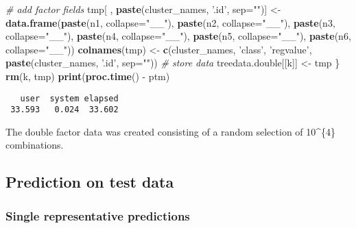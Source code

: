 \documentclass[]{article}
\newenvironment{Shaded}{\begin{snugshade}}{\end{snugshade}}
\newcommand{\KeywordTok}[1]{\textcolor[rgb]{0.13,0.29,0.53}{\textbf{{#1}}}}
\newcommand{\DataTypeTok}[1]{\textcolor[rgb]{0.13,0.29,0.53}{{#1}}}
\newcommand{\StringTok}[1]{\textcolor[rgb]{0.31,0.60,0.02}{{#1}}}
\newcommand{\CommentTok}[1]{\textcolor[rgb]{0.56,0.35,0.01}{\textit{{#1}}}}
\newcommand{\NormalTok}[1]{{#1}}
\begin{document}
\begin{Shaded}
\begin{Highlighting}[]
  \CommentTok{# add factor fields }
  \NormalTok{tmp[ , }\KeywordTok{paste}\NormalTok{(cluster_names, }\StringTok{'.id'}\NormalTok{, }\DataTypeTok{sep=}\StringTok{""}\NormalTok{)] <-}\StringTok{ }\KeywordTok{data.frame}\NormalTok{(}\KeywordTok{paste}\NormalTok{(n1, }\DataTypeTok{collapse=}\StringTok{"__"}\NormalTok{), }
                                              \KeywordTok{paste}\NormalTok{(n2, }\DataTypeTok{collapse=}\StringTok{"__"}\NormalTok{),}
                                              \KeywordTok{paste}\NormalTok{(n3, }\DataTypeTok{collapse=}\StringTok{"__"}\NormalTok{),}
                                              \KeywordTok{paste}\NormalTok{(n4, }\DataTypeTok{collapse=}\StringTok{"__"}\NormalTok{),}
                                              \KeywordTok{paste}\NormalTok{(n5, }\DataTypeTok{collapse=}\StringTok{"__"}\NormalTok{),}
                                              \KeywordTok{paste}\NormalTok{(n6, }\DataTypeTok{collapse=}\StringTok{"__"}\NormalTok{))}
  \KeywordTok{colnames}\NormalTok{(tmp) <-}\StringTok{ }\KeywordTok{c}\NormalTok{(cluster_names, }\StringTok{'class'}\NormalTok{, }\StringTok{'regvalue'}\NormalTok{, }
                     \KeywordTok{paste}\NormalTok{(cluster_names, }\StringTok{'.id'}\NormalTok{, }\DataTypeTok{sep=}\StringTok{""}\NormalTok{))}
  \CommentTok{# store data}
  \NormalTok{treedata.double[[k]] <-}\StringTok{ }\NormalTok{tmp}
\NormalTok{\}}
\KeywordTok{rm}\NormalTok{(k, tmp)}
\KeywordTok{print}\NormalTok{(}\KeywordTok{proc.time}\NormalTok{() -}\StringTok{ }\NormalTok{ptm)}
\end{Highlighting}
\end{Shaded}

\begin{verbatim}
   user  system elapsed 
 33.593   0.024  33.602 
\end{verbatim}

The double factor data was created consisting of a random selection of
10\^{}\{4\} combinations.

\subsection{Prediction on test data}\label{prediction-on-test-data}

\subsubsection{Single representative
predictions}\label{single-representative-predictions}
\end{document}

